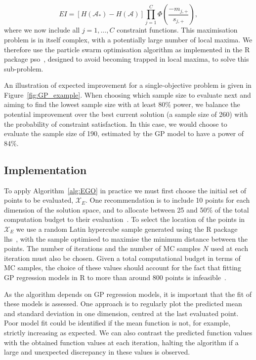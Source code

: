 \documentclass{article} %
\begin{document}
\begin{equation}
EI = [H(\mathcal{A}_{*}) - H(\mathcal{A})] \prod_{j=1}^{C} \Phi\left(\frac{-m_{j,+}}{s_{j,+}}\right),
\end{equation}
where we now include all $j = 1, \ldots , C$ constraint functions. This maximisation problem is in itself complex, with a potentially large number of local maxima. We therefore use the particle swarm optimisation algorithm as implemented in the R package pso~\cite{Bendtsen2012}, designed to avoid becoming trapped in local maxima, to solve this sub-problem.

An illustration of expected improvement for a single-objective problem is given in Figure~\ref{fig:GP_example}. When choosing which sample size to evaluate next and aiming to find the lowest sample size with at least 80\% power, we balance the potential improvement over the best current solution (a sample size of 260) with the probability of constraint satisfaction. In this case, we would choose to evaluate the sample size of 190, estimated by the GP model to have a power of 84\%.

\subsection{Implementation}

To apply Algorithm~\ref{alg:EGO} in practice we must first choose the initial set of points to be evaluated, $\mathcal{X}_{E}$. One recommendation is to include 10 points for each dimension of the solution space, and to allocate between 25 and 50\% of the total computation budget to their evaluation~\cite{}. To select the location of the points in $\mathcal{X}_{E}$ we use a random Latin hypercube sample generated using the R package lhs~\cite{Carnell2016}, with the sample optimised to maximise the minimum distance between the points. The number of iterations and the number of MC samples $N$ used at each iteration must also be chosen. Given a total computational budget in terms of MC samples, the choice of these values should account for the fact that fitting GP regression models in R to more than around 800 points is infeasible~\cite{Chevalier2014}. 

As the algorithm depends on GP regression models, it is important that the fit of these models is assessed. One approach is to regularly plot the predicted mean and standard deviation in one dimension, centred at the last evaluated point. Poor model fit could be identified if the mean function is not, for example, strictly increasing as expected. We can also contrast the predicted function values with the obtained function values at each iteration, halting the algorithm if a large and unexpected discrepancy in these values is observed.
\end{document}
